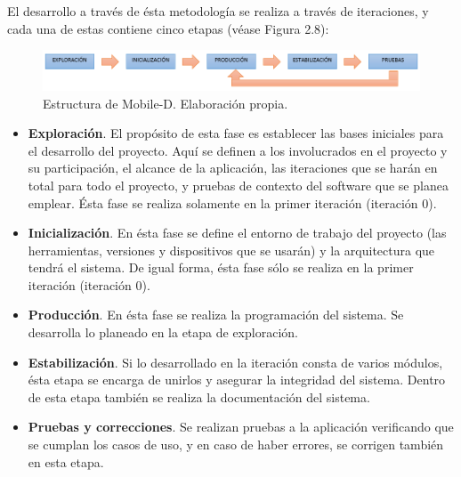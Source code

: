 El desarrollo a través de ésta metodología se realiza a través de iteraciones, y cada una de estas contiene cinco etapas (véase Figura 2.8):
\begin{figure}[h!]
	\centering
	\includegraphics[width=16cm]{imagenes/marcoteorico/mobiled.png}
	\caption{Estructura de Mobile-D. Elaboración propia.}
	\label{fig:mobiled}
\end{figure}
\begin{itemize}
	\item \textbf{Exploración}. El propósito de esta fase es establecer las bases iniciales para el desarrollo del proyecto. Aquí se definen a los involucrados en el proyecto y su participación, el alcance de la aplicación, las iteraciones que se harán en total para todo el proyecto, y pruebas de contexto del software que se planea emplear. Ésta fase se realiza solamente en la primer iteración (iteración 0).
	\item \textbf{Inicialización}. En ésta fase se define el entorno de trabajo del proyecto (las herramientas, versiones y dispositivos que se usarán) y la arquitectura que tendrá el sistema. De igual forma, ésta fase sólo se realiza en la primer iteración (iteración 0).
	\item \textbf{Producción}. En ésta fase se realiza la programación del sistema. Se desarrolla lo planeado en la etapa de exploración.
	\item \textbf{Estabilización}. Si lo desarrollado en la iteración consta de varios módulos, ésta etapa se encarga de unirlos y asegurar la integridad del sistema. Dentro de esta etapa también se realiza la documentación del sistema.
	\item \textbf{Pruebas y correcciones}. Se realizan pruebas a la aplicación verificando que se cumplan los casos de uso, y en caso de haber errores, se corrigen también en esta etapa.
\end{itemize}



